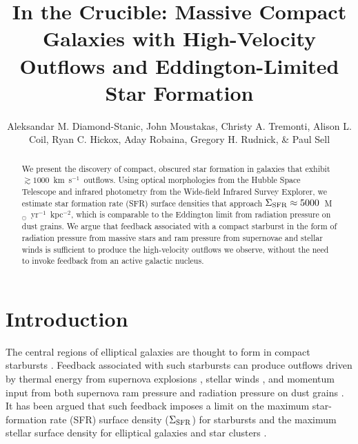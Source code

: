 \documentclass[apj]{emulateapj}
\newcommand{\kms}{km~s$^{-1}$}
\newcommand{\msun}{M$_{\odot}$}
\newcommand{\sigmasfr}{\Sigma_{\textnormal{\scriptsize{SFR}}}}
\begin{document}
\title{In the Crucible: Massive Compact Galaxies with High-Velocity
  Outflows and Eddington-Limited Star Formation}

\author{Aleksandar M. Diamond-Stanic, John
  Moustakas, Christy A. Tremonti,
  Alison L. Coil, Ryan C. Hickox, Aday
  Robaina, Gregory H. Rudnick, \& Paul
  Sell }




\begin{abstract}

We present the discovery of compact, obscured star formation in
galaxies that exhibit $\gtrsim1000$~\kms\ outflows.  Using optical
morphologies from the Hubble Space Telescope and infrared photometry
from the Wide-field Infrared Survey Explorer, we estimate star
formation rate (SFR) surface densities that approach
$\sigmasfr\approx5000$~\msun~yr$^{-1}$~kpc$^{-2}$, which is comparable
to the Eddington limit from radiation pressure on dust grains.  We
argue that feedback associated with a compact starburst in the form of
radiation pressure from massive stars and ram pressure from supernovae
and stellar winds is sufficient to produce the high-velocity outflows
we observe, without the need to invoke feedback from an active
galactic nucleus.

\end{abstract}


\section{Introduction}

The central regions of elliptical galaxies are thought to form in
compact starbursts \citep[e.g.,][]{kor09,hop09}.  Feedback associated
with such starbursts can produce outflows driven by thermal energy
from supernova explosions \citep[e.g.,][]{che85}, stellar winds
\citep[e.g.,][]{lei92}, and momentum input from both supernova ram
pressure and radiation pressure on dust grains \citep[e.g.,][]{mur05}.
It has been argued that such feedback imposes a limit on the maximum
star-formation rate (SFR) surface density ($\sigmasfr$) for starbursts
\citep[e.g.,][]{leh96,meu97,mur05,tho05} and the maximum stellar
surface density for elliptical galaxies and star clusters
\citep[e.g.,][]{hop10}.
\end{document}
